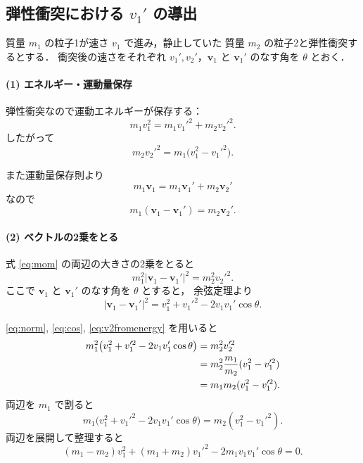 \documentclass[a4paper,12pt]{jlreq}
\begin{document}
\subsection*{弾性衝突における $v_1'$ の導出}

質量 $m_1$ の粒子1が速さ $v_1$ で進み，静止していた
質量 $m_2$ の粒子2と弾性衝突するとする．
衝突後の速さをそれぞれ $v_1', v_2'$，$\mathbf{v}_1$ と
$\mathbf{v}_1'$ のなす角を $\theta$ とおく．

\paragraph{(1) エネルギー・運動量保存}

弾性衝突なので運動エネルギーが保存する：
\begin{equation}
  m_1 v_1^2 = m_1 v_1'^2 + m_2 v_2'^2 .
  \label{eq:energy}
\end{equation}
したがって
\begin{equation}
  m_2 v_2'^2 = m_1 \bigl( v_1^2 - v_1'^2 \bigr).
  \label{eq:v2fromenergy}
\end{equation}

また運動量保存則より
\begin{equation}
  m_1 \mathbf{v}_1 = m_1 \mathbf{v}_1' + m_2 \mathbf{v}_2'
\end{equation}
なので
\begin{equation}
  m_1(\mathbf{v}_1 - \mathbf{v}_1') = m_2 \mathbf{v}_2'.
  \label{eq:mom}
\end{equation}

\paragraph{(2) ベクトルの2乗をとる}

式 \eqref{eq:mom} の両辺の大きさの2乗をとると
\begin{equation}
  m_1^2 \lvert \mathbf{v}_1 - \mathbf{v}_1' \rvert^2
    = m_2^2 v_2'^2 .
  \label{eq:norm}
\end{equation}
ここで $\mathbf{v}_1$ と $\mathbf{v}_1'$ のなす角を $\theta$ とすると，
余弦定理より
\begin{equation}
  \lvert \mathbf{v}_1 - \mathbf{v}_1' \rvert^2
    = v_1^2 + v_1'^2 - 2 v_1 v_1' \cos\theta .
  \label{eq:cos}
\end{equation}

\eqref{eq:norm}, \eqref{eq:cos}, \eqref{eq:v2fromenergy} を用いると
\begin{align}
  m_1^2 \bigl( v_1^2 + v_1'^2 - 2 v_1 v_1' \cos\theta \bigr)
    &= m_2^2 v_2'^2 \notag\\
    &= m_2^2 \frac{m_1}{m_2} (v_1^2 - v_1'^2) \notag\\
    &= m_1 m_2 (v_1^2 - v_1'^2) .
\end{align}
両辺を $m_1$ で割ると
\begin{equation}
  m_1 \bigl( v_1^2 + v_1'^2 - 2 v_1 v_1' \cos\theta \bigr)
    = m_2 (v_1^2 - v_1'^2).
\end{equation}
両辺を展開して整理すると
\begin{equation}
  (m_1 - m_2) v_1^2 + (m_1 + m_2) v_1'^2
    - 2 m_1 v_1 v_1' \cos\theta = 0 .
  \label{eq:quadratic}
\end{equation}
\end{document}
